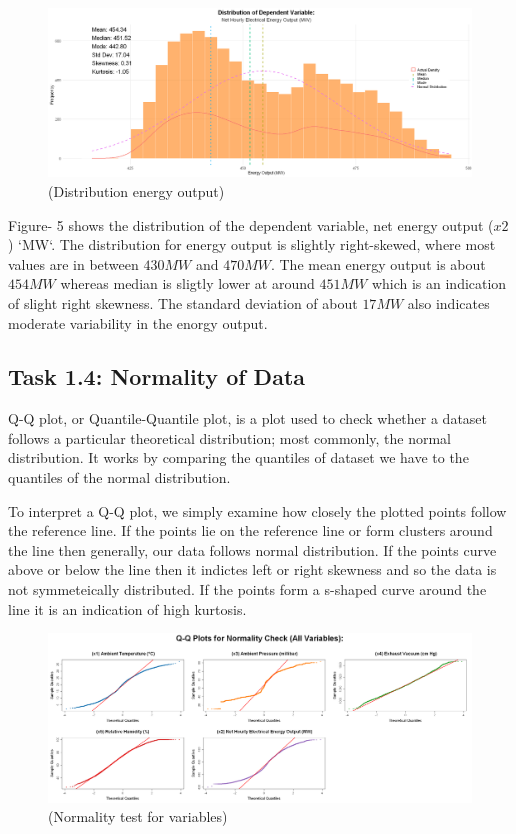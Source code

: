 \documentclass[12pt,a4paper]{article}
\begin{document}
\begin{figure}[H]
  \centering
  \includegraphics[width=\textwidth]{z7.png}
  \caption{(Distribution energy output)}
  \label{fig:Distribution plot for Dependent Variable ($x_2$)}
\end{figure}

Figure- 5 shows the distribution of the dependent variable, net energy output ($x2$) `MW`. 
The distribution for energy output
is slightly right-skewed, where most values are in between 
$430 MW$ and $470 MW$. The mean energy output is about $454 MW$ whereas 
median is sligtly lower at around $451 MW$ which is an indication of slight right skewness. 
The standard deviation of about $17 MW$ also indicates moderate variability in 
the enorgy output. 


\subsection*{Task 1.4: Normality of Data}

Q-Q plot, or Quantile-Quantile plot, is a plot used to check  
whether a dataset follows a particular theoretical distribution; most 
commonly, the normal distribution. It works by comparing the quantiles of dataset we have to the 
quantiles of the normal distribution. 

To interpret a Q-Q plot, we simply examine how closely the plotted points 
follow the reference line. If the points lie on the reference line or form clusters 
around the line then generally, our data follows normal distribution. If the 
points curve above or below the line then it indictes left or right skewness
and so the data is not symmeteically distributed. If the points form a s-shaped
curve around the line it is an indication of high kurtosis. 

\begin{figure}[H]
  \centering
  \includegraphics[width=\textwidth]{z8.png}
  \caption{(Normality test for variables)}
  \label{fig:Normality of Data}
\end{figure}
\end{document}
